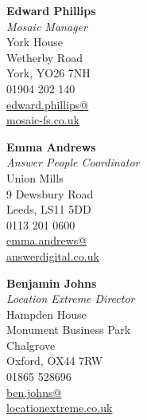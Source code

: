 \documentclass[a4paper]{cv}
\begin{document}
\begin{minipage}[t]{0.8\textwidth}
\begin{minipage}[t]{0.3\textwidth}
\textbf{Edward Phillips} \\
\textit{Mosaic Manager} \\
York House \\
Wetherby Road \\
York, YO26 7NH \\
01904 202 140 \\
\href{mailto:edward.phillips@mosaic-fs.co.uk}{edward.phillips@\\mosaic-fs.co.uk}
\end{minipage}
\begin{minipage}[t]{0.3\textwidth}
\textbf{Emma Andrews} \\
\textit{Answer People Coordinator} \\
Union Mills \\
9 Dewsbury Road \\
Leeds, LS11 5DD \\
0113 201 0600 \\
\href{mailto:emma.andrews@answerdigital.co.uk}{emma.andrews@\\answerdigital.co.uk}
\end{minipage}
\begin{minipage}[t]{0.3\textwidth}
\textbf{Benjamin Johns} \\
\textit{Location Extreme Director} \\
Hampden House \\
Monument Business Park \\
Chalgrove \\
Oxford, OX44 7RW \\
01865 528696 \\
\href{mailto:ben.johns@locationextreme.co.uk}{ben.johns@\\locationextreme.co.uk}
\end{minipage}

\sectionspace %

\vfill

{}

\end{minipage}
\end{document}
